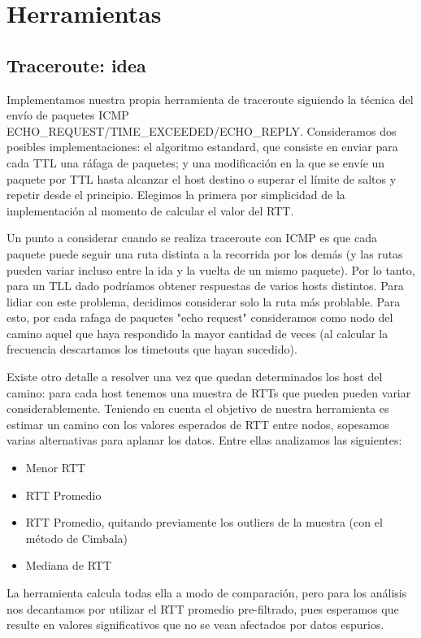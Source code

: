 \section{Herramientas}

\subsection{Traceroute: idea}

Implementamos nuestra propia herramienta de traceroute siguiendo la técnica del envío de paquetes ICMP ECHO\_REQUEST/TIME\_EXCEEDED/ECHO\_REPLY. Consideramos dos posibles implementaciones: el algoritmo estandard, que consiste en enviar para cada TTL una ráfaga de paquetes; y una modificación en la que se envíe un paquete por TTL hasta alcanzar el host destino o superar el límite de saltos y repetir desde el principio. Elegimos la primera por simplicidad de la implementación al momento de calcular el valor del RTT.

Un punto a considerar cuando se realiza traceroute con ICMP es que cada paquete puede seguir una ruta distinta a la recorrida por los demás (y las rutas  pueden variar incluso entre la ida y la vuelta de un mismo paquete). Por lo tanto, para un TLL dado podríamos obtener respuestas de varios hosts distintos. Para lidiar con este problema, decidimos considerar solo la ruta más problable. Para esto, por cada rafaga de paquetes "echo request" consideramos como nodo del camino aquel que haya respondido la mayor cantidad de veces (al calcular la frecuencia descartamos los timetouts que hayan sucedido).

Existe otro detalle a resolver una vez que quedan determinados los host del camino: para cada host tenemos una muestra de RTTs que pueden  pueden variar considerablemente. Teniendo en cuenta el objetivo de nuestra herramienta es estimar un camino con los valores esperados de RTT entre nodos, sopesamos varias alternativas para aplanar los datos. Entre ellas analizamos las siguientes:
\begin{itemize}
\item{Menor RTT}
\item{RTT Promedio}
\item{RTT Promedio, quitando previamente los outliers de la muestra (con el método de Cimbala)}
\item{Mediana de RTT}
\end{itemize}
La herramienta calcula todas ella a modo de comparación, pero para los análisis nos decantamos por utilizar el RTT promedio pre-filtrado, pues esperamos que resulte en valores significativos que no se vean afectados por datos espurios. 


